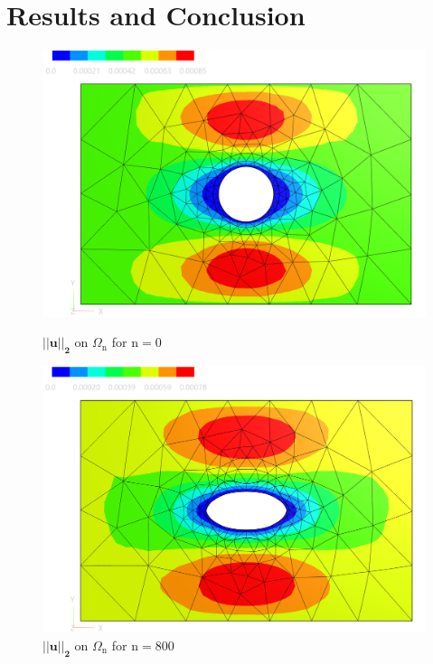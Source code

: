 \section{Results and Conclusion}
\begin{figure}[h]
\begin{minipage}{.5\textwidth}
    \centering
    \includegraphics[width=1\textwidth]{figures/u_0.PNG}
    \caption{ $\mathbf{||u||_2}$ on $\Omega_{\mathrm{n}}$ for $\mathrm{n}=0$}
    \label{plot_ref_u_0}
\end{minipage}
\begin{minipage}{.5\textwidth}
    \centering
    \includegraphics[width=1\textwidth]{figures/u_final.PNG}
    \caption{ $\mathbf{||u||_2}$ on $\Omega_{\mathrm{n}}$ for $\mathrm{n}=800$}
    \label{plot_ref_u_final}
\end{minipage}
\end{figure}

